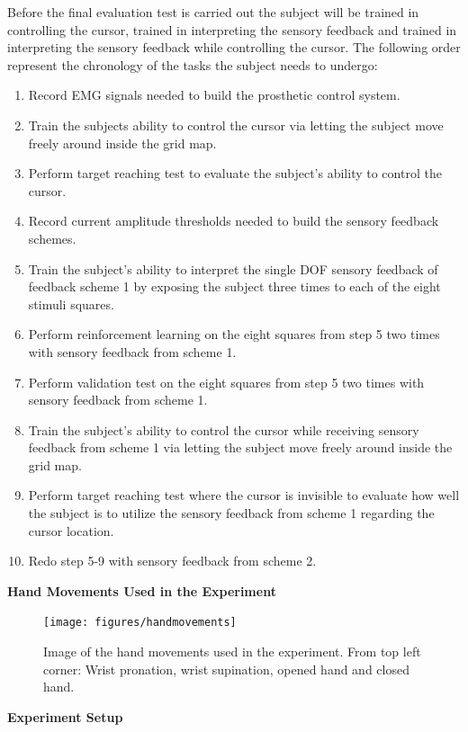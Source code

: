 Before the final evaluation test is carried out the subject will be trained in controlling the cursor, trained in interpreting the sensory feedback and trained in interpreting the sensory feedback while controlling the cursor. The following order represent the chronology of the tasks the subject needs to undergo:

\begin{enumerate}
	\item Record EMG signals needed to build the prosthetic control system.
	\item Train the subjects ability to control the cursor via letting the subject move freely around inside the grid map.
	\item Perform target reaching test to evaluate the subject's ability to control the cursor.
	\item Record current amplitude thresholds needed to build the sensory feedback schemes.
	\item Train the subject's ability to interpret the single DOF sensory feedback of feedback scheme 1 by exposing the subject three times to each of the eight stimuli squares.
	\item Perform reinforcement learning on the eight squares from step 5 two times with sensory feedback from scheme 1.
	\item Perform validation test on the eight squares from step 5 two times with sensory feedback from scheme 1.
	\item Train the subject's ability to control the cursor while receiving sensory feedback from scheme 1 via letting the subject move freely around inside the grid map.
	\item Perform target reaching test where the cursor is invisible to evaluate how well the subject is to utilize the sensory feedback from scheme 1 regarding the cursor location.
	\item Redo step 5-9 with sensory feedback from scheme 2.
\end{enumerate}


\textbf{{\Large Hand Movements Used in the Experiment}}

\begin{figure}[H]                 
	\texttt{[image: figures/handmovements]}  
	\caption{Image of the hand movements used in the experiment. From top left corner: Wrist pronation, wrist supination, opened hand and closed hand.}
	\label{fig:handmovements} 
\end{figure}

\textbf{{\Large Experiment Setup}}

